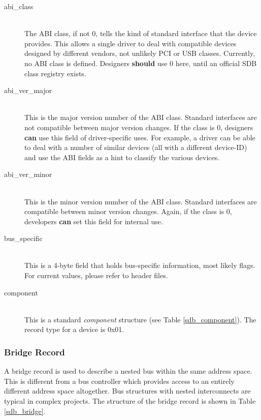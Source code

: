 \documentclass[a4paper, 12pt]{article}
\begin{document}
\begin{description}
\item[abi\_class] \hfill \\
The ABI class, if not 0, tells the kind of standard interface that the device provides. This
allows a single driver to deal with compatible devices designed by different vendors, not unlikely
PCI or USB classes.  Currently, no ABI class is defined. Designers \textbf{should} use 0 here,
until an official SDB class registry exists.

\item[abi\_ver\_major] \hfill \\
This is the major version number of the ABI class. Standard interfaces are not compatible between
major version changes.  If the class is 0, designers \textbf{can} use this field of driver-specific uses. For
example, a driver can be able to deal with a number of similar devices (all with a different device-ID)
and use the ABI fields as a hint to classify the various devices.

\item[abi\_ver\_minor] \hfill \\
This is the minor version number of the ABI class. Standard interfaces are compatible between
minor version changes. Again, if the class is 0, developers \textbf{can} set this field for internal use.

\item[bus\_specific] \hfill \\
This is a 4-byte field that holds bus-specific information, most likely flags. For current
values, please refer to header files.

\item[component] \hfill \\
This is a standard \textit{component} structure (see Table \ref{sdb_component}). The record type
for a device is 0x01.
\end{description}

\pagebreak 

\subsubsection{Bridge Record}

A bridge record is used to describe a nested bus within the same address space. This is different from
a bus controller which provides access to an entirely different address space altogether. Bus
structures with nested interconnects are typical in complex projects.
The structure of the bridge record is shown in Table \ref{sdb_bridge}.
\end{document}

